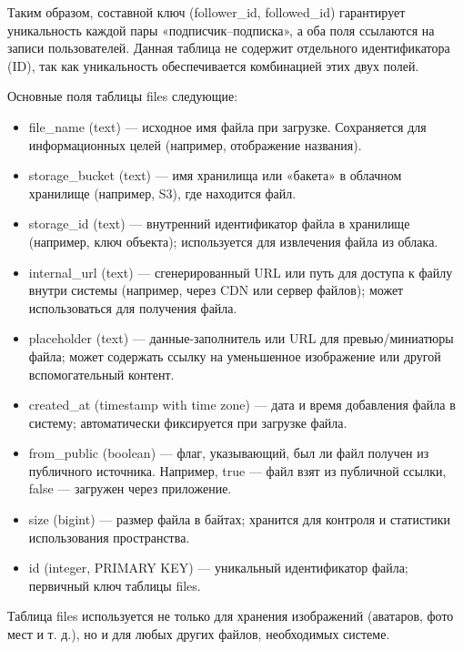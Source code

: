 Таким образом, составной ключ (follower\_id, followed\_id) гарантирует уникальность каждой пары «подписчик–подписка», а оба поля ссылаются на записи пользователей. Данная таблица не содержит отдельного идентификатора (ID), так как уникальность обеспечивается комбинацией этих двух полей.

Основные поля таблицы files следующие:
\begin{itemize}
    \item file\_name (text) — исходное имя файла при загрузке. Сохраняется для информационных целей (например, отображение названия).
    \item storage\_bucket (text) — имя хранилища или «бакета» в облачном хранилище (например, S3), где находится файл.
    \item storage\_id (text) — внутренний идентификатор файла в хранилище (например, ключ объекта); используется для извлечения файла из облака.
    \item internal\_url (text) — сгенерированный URL или путь для доступа к файлу внутри системы (например, через CDN или сервер файлов); может использоваться для получения файла.
    \item placeholder (text) — данные-заполнитель или URL для превью/миниатюры файла; может содержать ссылку на уменьшенное изображение или другой вспомогательный контент.
    \item created\_at (timestamp with time zone) — дата и время добавления файла в систему; автоматически фиксируется при загрузке файла.
    \item from\_public (boolean) — флаг, указывающий, был ли файл получен из публичного источника. Например, true — файл взят из публичной ссылки, false — загружен через приложение.
    \item size (bigint) — размер файла в байтах; хранится для контроля и статистики использования пространства.
    \item id (integer, PRIMARY KEY) — уникальный идентификатор файла; первичный ключ таблицы files.
\end{itemize}
Таблица files используется не только для хранения изображений (аватаров, фото мест и т. д.), но и для любых других файлов, необходимых системе.
